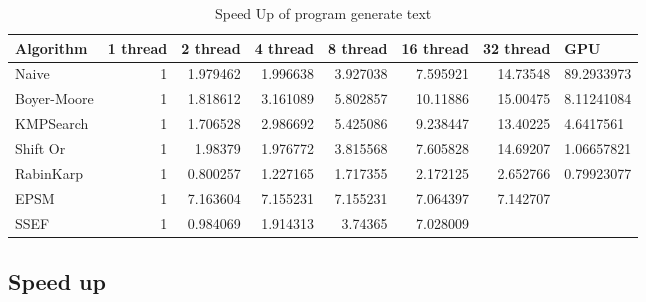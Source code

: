 \documentclass[11pt]{article}       %
\newcommand{\includeFig}[3]      {\begin{figure}[htb] \begin{center}
                                 \includegraphics
                                 [width=4in,keepaspectratio] %
                                 {#2}\caption{\label{#1}#3} \end{center} \end{figure}}
\begin{document}
\begin{table}[htbp]
  \centering
  \caption{Speed Up of program generate text}
    \begin{tabular}{lrrrrrr}\label{t9}
Algorithm & 1 thread & 2 thread & 4 thread & 8 thread & 16 thread & 32 thread & GPU \\
 \hline
    Naive & 1     & 1.979462 & 1.996638 & 3.927038 & 7.595921 & 14.73548 & 89.2933973 \\
    Boyer-Moore & 1     & 1.818612 & 3.161089 & 5.802857 & 10.11886 & 15.00475 & 8.11241084 \\
    KMPSearch & 1     & 1.706528 & 2.986692 & 5.425086 & 9.238447 & 13.40225 & 4.6417561 \\
    Shift Or & 1     & 1.98379 & 1.976772 & 3.815568 & 7.605828 & 14.69207 & 1.06657821 \\
    RabinKarp & 1     & 0.800257 & 1.227165 & 1.717355 & 2.172125 & 2.652766 & 0.79923077 \\
    EPSM  & 1     & 7.163604 & 7.155231 & 7.155231 & 7.064397 & 7.142707 &  \\
    SSEF  & 1     & 0.984069 & 1.914313 & 3.74365 & 7.028009 &       &  \\

    \end{tabular}%
  \label{tab:addlabel}%
\end{table}%

\subsection{Speed up}\label{su}
\end{document}
